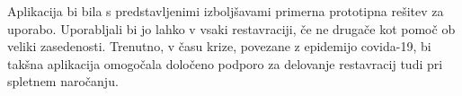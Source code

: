 \documentclass[a4paper, 12pt]{book}
\begin{document}
Aplikacija bi bila s predstavljenimi izboljšavami primerna prototipna rešitev za uporabo. Uporabljali bi jo lahko v vsaki restavraciji, če ne drugače kot pomoč ob veliki zasedenosti. Trenutno, v času krize, povezane z epidemijo covida-19, bi takšna aplikacija omogočala določeno podporo za delovanje restavracij tudi pri spletnem naročanju.


\newpage %
\ \\
\clearpage
{}


\end{document}
